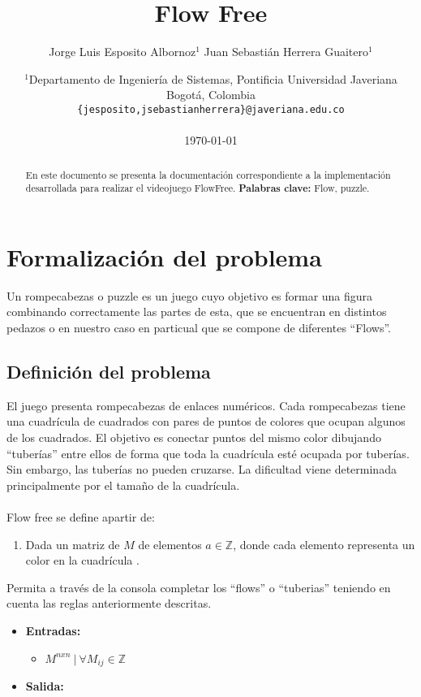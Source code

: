 \documentclass[letter]{article}
\title {Flow Free}
\author{ Jorge Luis Esposito Albornoz$^1$  Juan Sebastián Herrera Guaitero$^1$}
\date{
	$^1$Departamento de Ingeniería de Sistemas, Pontificia Universidad Javeriana\\Bogotá,  Colombia \\
	\texttt{\{jesposito,jsebastianherrera\}@javeriana.edu.co}\\~\\
	\today
}
\begin{document}
\maketitle

\begin{abstract}
	En este documento se presenta la documentaci\'on correspondiente a la implementaci\'on desarrollada para realizar el videojuego FlowFree.
	\textbf{Palabras clave:} Flow, puzzle.
\end{abstract}

\tableofcontents

\newpage
\section{Formalización del problema}
Un rompecabezas o puzzle  es un juego cuyo objetivo es formar una figura combinando correctamente las partes de esta, que se encuentran en distintos pedazos o en nuestro caso en particual que se compone de diferentes ``Flows''.

\subsection{Definici\'on del problema}
El juego presenta rompecabezas de enlaces numéricos. Cada rompecabezas tiene una cuadrícula de cuadrados con pares de puntos de colores que ocupan algunos de los cuadrados.
El objetivo es conectar puntos del mismo color dibujando ``tuber\'ias'' entre ellos de forma que toda la cuadrícula esté ocupada por tuberías. Sin embargo, las tuberías no pueden cruzarse. La dificultad viene determinada principalmente por el tamaño de la cuadrícula.\\\\
Flow free se define apartir de:
\begin{enumerate}
	\item Dada un matriz de $M$ de elementos $a \in \mathbb{Z} $, donde cada elemento representa un color en la cuadr\'icula .
\end{enumerate}
Permita a trav\'es de la consola completar los ``flows'' o ``tuberias'' teniendo en cuenta las reglas anteriormente descritas.
\begin{itemize}
	\item \textbf{Entradas:}
	      \begin{itemize}
		      \item $M^{nxn} ~ | ~ \forall M_{ij} \in \mathbb{Z}$
	      \end{itemize}
	\item \textbf{Salida:}
\end{itemize}
\end{document}
